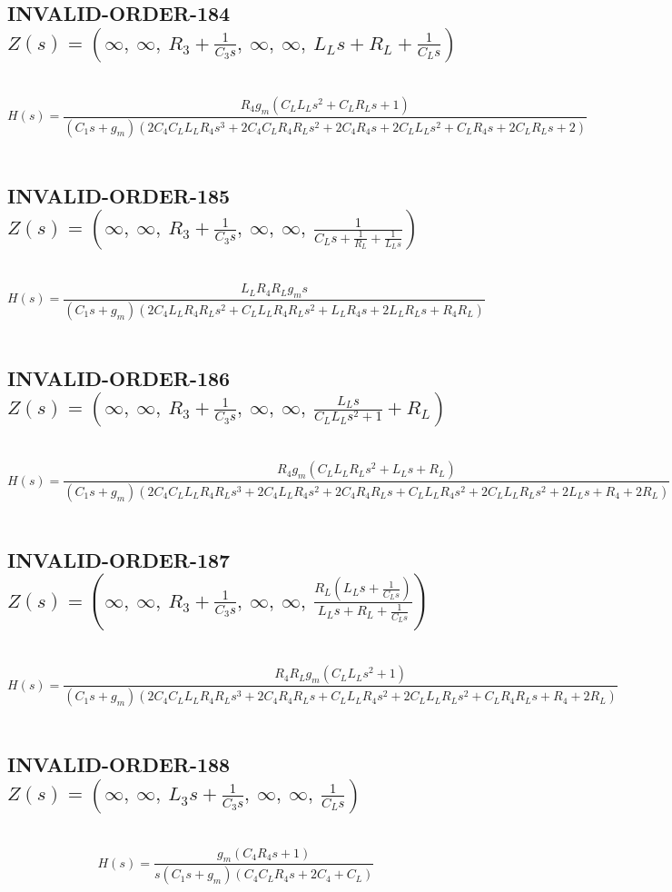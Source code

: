 \documentclass{article}
\begin{document}
\subsection{INVALID-ORDER-184 $Z(s) = \left( \infty, \  \infty, \  R_{3} + \frac{1}{C_{3} s}, \  \infty, \  \infty, \  L_{L} s + R_{L} + \frac{1}{C_{L} s}\right)$ } \ 
\textbf{\[H(s) = \frac{R_{4} g_{m} \left(C_{L} L_{L} s^{2} + C_{L} R_{L} s + 1\right)}{\left(C_{1} s + g_{m}\right) \left(2 C_{4} C_{L} L_{L} R_{4} s^{3} + 2 C_{4} C_{L} R_{4} R_{L} s^{2} + 2 C_{4} R_{4} s + 2 C_{L} L_{L} s^{2} + C_{L} R_{4} s + 2 C_{L} R_{L} s + 2\right)}\] } \ 
\subsection{INVALID-ORDER-185 $Z(s) = \left( \infty, \  \infty, \  R_{3} + \frac{1}{C_{3} s}, \  \infty, \  \infty, \  \frac{1}{C_{L} s + \frac{1}{R_{L}} + \frac{1}{L_{L} s}}\right)$ } \ 
\textbf{\[H(s) = \frac{L_{L} R_{4} R_{L} g_{m} s}{\left(C_{1} s + g_{m}\right) \left(2 C_{4} L_{L} R_{4} R_{L} s^{2} + C_{L} L_{L} R_{4} R_{L} s^{2} + L_{L} R_{4} s + 2 L_{L} R_{L} s + R_{4} R_{L}\right)}\] } \ 
\subsection{INVALID-ORDER-186 $Z(s) = \left( \infty, \  \infty, \  R_{3} + \frac{1}{C_{3} s}, \  \infty, \  \infty, \  \frac{L_{L} s}{C_{L} L_{L} s^{2} + 1} + R_{L}\right)$ } \ 
\textbf{\[H(s) = \frac{R_{4} g_{m} \left(C_{L} L_{L} R_{L} s^{2} + L_{L} s + R_{L}\right)}{\left(C_{1} s + g_{m}\right) \left(2 C_{4} C_{L} L_{L} R_{4} R_{L} s^{3} + 2 C_{4} L_{L} R_{4} s^{2} + 2 C_{4} R_{4} R_{L} s + C_{L} L_{L} R_{4} s^{2} + 2 C_{L} L_{L} R_{L} s^{2} + 2 L_{L} s + R_{4} + 2 R_{L}\right)}\] } \ 
\subsection{INVALID-ORDER-187 $Z(s) = \left( \infty, \  \infty, \  R_{3} + \frac{1}{C_{3} s}, \  \infty, \  \infty, \  \frac{R_{L} \left(L_{L} s + \frac{1}{C_{L} s}\right)}{L_{L} s + R_{L} + \frac{1}{C_{L} s}}\right)$ } \ 
\textbf{\[H(s) = \frac{R_{4} R_{L} g_{m} \left(C_{L} L_{L} s^{2} + 1\right)}{\left(C_{1} s + g_{m}\right) \left(2 C_{4} C_{L} L_{L} R_{4} R_{L} s^{3} + 2 C_{4} R_{4} R_{L} s + C_{L} L_{L} R_{4} s^{2} + 2 C_{L} L_{L} R_{L} s^{2} + C_{L} R_{4} R_{L} s + R_{4} + 2 R_{L}\right)}\] } \ 
\subsection{INVALID-ORDER-188 $Z(s) = \left( \infty, \  \infty, \  L_{3} s + \frac{1}{C_{3} s}, \  \infty, \  \infty, \  \frac{1}{C_{L} s}\right)$ } \ 
\textbf{\[H(s) = \frac{g_{m} \left(C_{4} R_{4} s + 1\right)}{s \left(C_{1} s + g_{m}\right) \left(C_{4} C_{L} R_{4} s + 2 C_{4} + C_{L}\right)}\] } \ 
\end{document}
